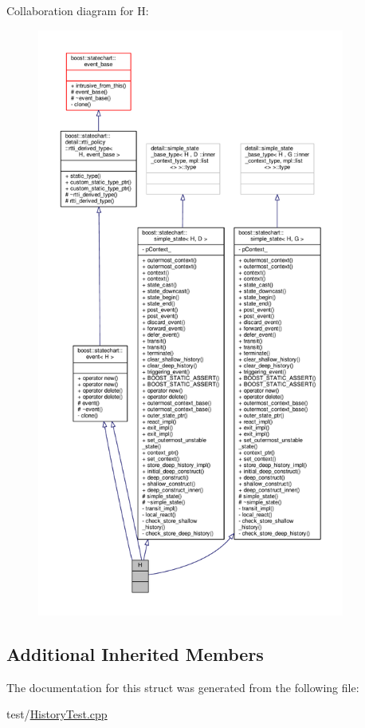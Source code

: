 Collaboration diagram for H\+:
\nopagebreak
\begin{figure}[H]
\begin{center}
\leavevmode
\includegraphics[height=550pt]{struct_h__coll__graph}
\end{center}
\end{figure}
\subsection*{Additional Inherited Members}


The documentation for this struct was generated from the following file\+:\begin{DoxyCompactItemize}
\item 
test/\mbox{\hyperlink{_history_test_8cpp}{History\+Test.\+cpp}}\end{DoxyCompactItemize}

